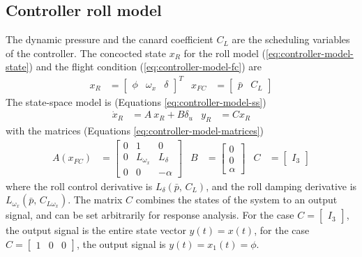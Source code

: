 \subsection{Controller roll model}
\label{sec:controller_model}
The dynamic pressure and the canard coefficient $C_L$ are the scheduling variables of the controller.
The concocted state $x_R$ for the roll model (\autoref{eq:controller-model-state}) and the flight condition (\autoref{eq:controller-model-fc}) are
\begin{align}
    x_R &= \begin{bmatrix} \phi & \omega_x & \delta \end{bmatrix}^T 
    & 
    x_{FC} &= \begin{bmatrix} \bar p & C_L \end{bmatrix}
    \nonumber
\end{align}
The state-space model is (Equations \ref{eq:controller-model-ss})
\begin{align}
    \dot x_R &= A \: x_R + B \delta_u 
    &
    y_R &= C x_R
    \nonumber
\end{align}
with the matrices (Equations \ref{eq:controller-model-matrices})
\begin{align}    
    A(x_{FC}) &= \begin{bmatrix}
        0 & 1 & 0 \\
        0 & L_{\omega_x} & L_\delta \\
        0 & 0 & -\alpha
    \end{bmatrix}
    &
    B &= \begin{bmatrix}
        0 \\ 0 \\ \alpha
    \end{bmatrix}
    &
    C &= \begin{bmatrix} I_3 \end{bmatrix}
    \nonumber
\end{align}
where the roll control derivative is $L_\delta (\bar p,  \,  C_L)$, and the roll damping derivative is $L_{\omega_x} (\bar p, \, C_{L \omega_x})$.
The matrix $C$ combines the states of the system to an output signal, and can be set arbitrarily for response analysis.
For the case $C = \begin{bmatrix} I_3 \end{bmatrix}$, the output signal is the entire state vector $y(t) = x(t)$, for the case $C = \begin{bmatrix} 1 & 0 & 0 \end{bmatrix}$, the output signal is $y(t) = x_1(t) = \phi$.

